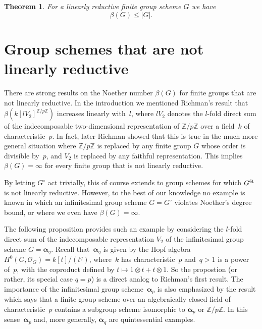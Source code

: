 \documentclass[reqno]{amsart}
\newcommand{\ZZ}{{\mathbb{Z}}}
\newcommand{\OO}{{\mathcal O}}
\newcommand{\et}{{\rm \acute{e}t}}
\newcommand{\balpha}{\boldsymbol{\alpha}}
\theoremstyle{definition}
\theoremstyle{plain}
\newtheorem{Theorem}[Definition]{Theorem}
\begin{document}
\begin{Theorem}
  For a linearly reductive finite group scheme $G$ we have
  \[
    \beta(G) \le |G|.
  \]
\end{Theorem}

\section{Group schemes that are not linearly reductive}
\label{sAlpha}

There are strong results on the Noether number $\beta(G)$ for finite
groups that are not linearly reductive. In the introduction we
mentioned Richman's \cite{Richman90} result that
$\beta(k[l V_2]^{\ZZ/p\ZZ})$ increases linearly with~$l$, where $l V_2$
denotes the $l$-fold direct sum of the indecomposable two-dimensional
representation of $\ZZ/p\ZZ$ over a field~$k$ of characteristic~$p$. In
fact, later Richman \cite{Richman} showed that this is true in the
much more general situation where $\ZZ/p\ZZ$ is replaced by any finite
group $G$ whose order is divisible by~$p$, and $V_2$ is replaced by
any faithful representation. This implies $\beta(G) = \infty$ for
every finite group that is not linearly reductive.

By letting $G^\circ$ act trivially, this of course extends to group
schemes for which $G^\et$ is not linearly reductive.  However, to the
best of our knowledge no example is known in which an infinitesimal
group scheme $G = G^\circ$ violates Noether's degree bound, or where
we even have $\beta(G) = \infty$.

The following proposition provides such an example by considering the
$l$-fold direct sum of the indecomposable representation $V_2$ of the
infinitesimal group scheme $G = \balpha_q$. Recall that~$\balpha_q$ is
given by the Hopf algebra $H^0(G,\OO_G) = k[t]/(t^q)$, where~$k$ has
characteristic~$p$ and~$q > 1$ is a power of~$p$, with the coproduct
defined by $t \mapsto 1 \otimes t + t \otimes 1$. So the propostion
(or rather, its special case $q = p$) is a direct analog to Richman's
\cite{Richman90} first result. The importance of the infinitesimal
group scheme~$\balpha_p$ is also emphasized by the result \cite[Lemma
2.3]{LRQ} which says that a finite group scheme over an algebraically
closed field of characteristic~$p$ contains a subgroup scheme
isomorphic to $\balpha_p$ or $\ZZ/p\ZZ$. In this sense~$\balpha_p$ and, more
generally, $\balpha_q$ are quintessential examples. 

\newcommand{\pr}{k[x_1, y_1, \dots, x_l, y_l]}
\newcommand{\prg}{k[x_1, y_1, \dots, x_{l+1}, y_{l+1}]}
\end{document}
